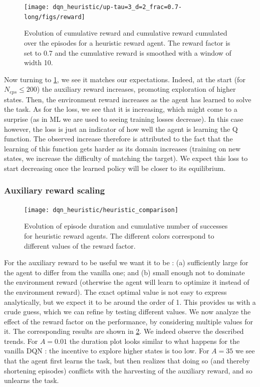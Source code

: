 \documentclass[a4paper, 12pt,oneside]{article}
\begin{document}
        \begin{figure}
            \centering
            \vspace{-2em}
            \texttt{[image: dqn\_heuristic/up-tau=3\_d=2\_frac=0.7-long/figs/reward]}
            \caption{Evolution of cumulative reward and cumulative reward cumulated over the episodes for a heuristic reward agent. The reward factor is set to 0.7 and the cumulative reward is smoothed with a window of width 10.}
            \label{fig:dqn-heuristic-frac=0.7-reward}
        \end{figure}
        Now turning to \ref{fig:dqn-heuristic-frac=0.7-reward}, we see it matches our expectations. Indeed, at the start (for $N_{eps}\le 200$) the auxiliary reward increases, promoting exploration of higher states. Then, the environment reward increases as the agent has learned to solve the task. 
        As for the loss, we see that it is increasing, which might come to a surprise (as in ML we are used to seeing training losses decrease). In this case however, the loss is just an indicator of how well the agent is learning the Q function. The observed increase therefore is attributed to the fact that the learning of this function gets harder as its domain increases (training on new states, we increase the difficulty of matching the target). We expect this loss to start decreasing once the learned policy will be closer to its equilibrium. 
        \subsubsection{Auxiliary reward scaling}
        \begin{figure}
            \centering
            \vspace{-1em}
            \texttt{[image: dqn\_heuristic/heuristic\_comparison]}
            \caption{Evolution of episode duration and cumulative number of successes for heuristic reward agents. The different colors correspond to different values of the reward factor.}
            \label{fig:dqn-heuristic-comparison}
        \end{figure}
        For the auxiliary reward to be useful we want it to be : (a) sufficiently large for the agent to differ from the vanilla one; and (b) small enough not to dominate the environment reward (otherwise the agent will learn to optimize it instead of the environment reward). The exact optimal value is not easy to express analytically, but we expect it to be around the order of 1. This provides us with a crude guess, which we can refine by testing different values.
        We now analyze the effect of the reward factor on the performance, by considering multiple values for it. The corresponding results are shown in \ref{fig:dqn-heuristic-comparison}. We indeed observe the described trends. For $A=0.01$ the duration plot looks similar to what happens for the vanilla DQN : the incentive to explore higher states is too low. For $A=35$ we see that the agent first learns the task, but then realizes that doing so (and thereby shortening episodes) conflicts with the harvesting of the auxiliary reward, and so unlearns the task.
\end{document}
